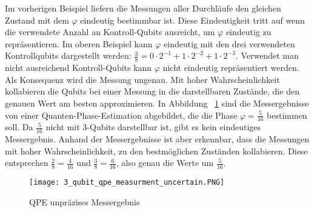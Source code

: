 Im vorherigen Beispiel liefern die Messungen aller Durchläufe den gleichen Zustand mit dem \(\varphi\) eindeutig bestimmbar ist.
Diese Eindeutigkeit tritt auf wenn die verwendete Anzahl an Kontroll-Qubits ausreicht, 
um \(\varphi\) eindeutig zu repräsentieren.
Im oberen Beispiel kann \(\varphi\) eindeutig mit den drei verwendeten Kontrollqubits dargestellt werden:
\({\frac{3}{8} =0 \cdot 2^{-1} + 1\cdot2^{-2} + 1\cdot2^{-3}}\).
Verwendet man nicht ausreichend Kontroll-Qubits kann \(\varphi\) nicht eindeutig repräsentiert werden.
Als Konsequenz wird die Messung ungenau.
Mit hoher Wahrscheinlichkeit kollabieren die Qubits bei einer Messung 
in die darstellbaren Zustände, die den genauen Wert am besten approximieren.
In Abbildung ~\ref*{fig:3_qubit_qpe_measurment_uncertain} sind die Messergebnisse von einer Quanten-Phase-Estimation
abgebildet, die die Phase \(\varphi = \frac{5}{16}\) bestimmen soll.
Da \(\frac{5}{16}\) nicht mit 3-Qubits darstellbar ist, gibt es kein eindeutiges Messergebnis.
Anhand der Messergebnisse ist aber erkennbar, dass die Messungen mit hoher Wahrscheinlichkeit,
zu den bestmöglichen Zuständen kollabieren.
Diese entsprechen \({\frac{2}{8} = \frac{4}{16}}\) und \({\frac{3}{8} = \frac{6}{16}}\), 
also genau die Werte um \(\frac{5}{16}\).


\begin{figure}
  \caption{QPE unpräzises Messergebnis}
  \label{fig:3_qubit_qpe_measurment_uncertain}
  \texttt{[image: 3\_qubit\_qpe\_measurment\_uncertain.PNG]}
  \centering
  \end{figure}












 






 











